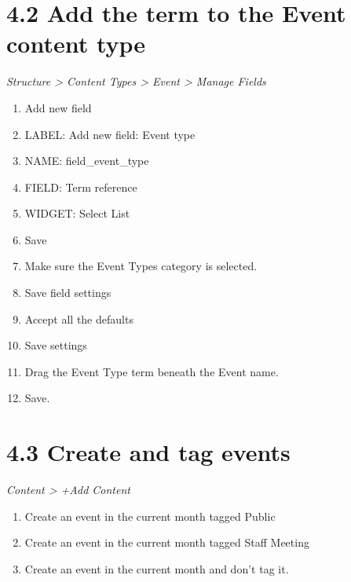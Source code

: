 \documentclass[letterpaper,10pt,english]{sphinxmanual}
\begin{document}
\section{4.2 Add the term to the Event content type}
\label{event_calendar:add-the-term-to-the-event-content-type}
\emph{Structure \textgreater{} Content Types \textgreater{} Event \textgreater{} Manage Fields}
\begin{enumerate}
\item {} 
Add new field

\item {} 
LABEL: Add new field: Event type

\item {} 
NAME: field\_event\_type

\item {} 
FIELD: Term reference

\item {} 
WIDGET: Select List

\item {} 
Save

\item {} 
Make sure the Event Types category is selected.

\item {} 
Save field settings

\item {} 
Accept all the defaults

\item {} 
Save settings

\item {} 
Drag the Event Type term beneath the Event name.

\item {} 
Save.

\end{enumerate}


\section{4.3 Create and tag events}
\label{event_calendar:create-and-tag-events}
\emph{Content \textgreater{} +Add Content}
\begin{enumerate}
\item {} 
Create an event in the current month tagged Public

\item {} 
Create an event in the current month tagged Staff Meeting

\item {} 
Create an event in the current month and don't tag it.

\end{enumerate}
\end{document}

